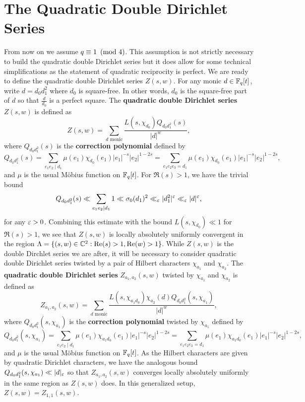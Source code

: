 \documentclass[12pt,reqno,oneside]{amsart}
\begin{document}
\section{The Quadratic Double Dirichlet Series}
    From now on we assume $q \equiv 1 \ \left(\text{mod }4\right)$. This assumption is not strictly necessary to build the quadratic double Dirichlet series but it does allow for some technical simplifications as the statement of quadratic reciprocity is perfect. We are ready to define the quadratic double Dirichlet series $Z(s,w)$. For any monic $d \in \mathbb{F}_{q}[t]$, write $d = d_{0}d_{1}^{2}$ where $d_{0}$ is square-free. In other words, $d_{0}$ is the square-free part of $d$ so that $\frac{d}{d_{0}}$ is a perfect square. The \textbf{quadratic double Dirichlet series} $Z(s,w)$ is defined as
    \[
        Z(s,w) = \sum_{\text{$d$ monic}}\frac{L(s,\chi_{d_{0}})Q_{d_{0}d_{1}^{2}}(s)}{|d|^{w}},
    \]
    where $Q_{d_{0}d_{1}^{2}}(s)$ is the \textbf{correction polynomial} defined by
    \[
        Q_{d_{0}d_{1}^{2}}(s) = \sum_{e_{1}e_{2} \mid d_{1}}\mu(e_{1})\chi_{d_{0}}(e_{1})|e_{1}|^{-s}|e_{2}|^{1-2s} = \sum_{e_{1}e_{2}e_{3} = d_{1}}\mu(e_{1})\chi_{d_{0}}(e_{1})|e_{1}|^{-s}|e_{2}|^{1-2s},
    \]
    and $\mu$ is the usual M\"obius function on $\mathbb{F}_{q}[t]$. For $\Re(s) > 1$, we have the trivial bound
    \[
        Q_{d_{0}d_{1}^{2}}(s) \ll \sum_{e_{1}e_{2} \mid d_{1}}1 \ll \sigma_{0}(d_{1})^{2} \ll_{\varepsilon} |d_{1}^{2}|^{\varepsilon} \ll_{\varepsilon} |d|^{\varepsilon},
    \]
    for any $\varepsilon > 0$. Combining this estimate with the bound $L(s,\chi_{d_{0}}) \ll 1$ for $\Re(s) > 1$, we see that $Z(s,w)$ is locally absolutely uniformly convergent in the region $\Lambda = \{(s,w) \in \mathbb{C}^{2}:\mathrm{Re}(s) > 1, \mathrm{Re}(w) > 1\}$. While $Z(s,w)$ is the double Dirchlet series we are after, it will be necessary to consider quadratic double Dirichlet series twisted by a pair of Hilbert characters $\chi_{a_{1}}$ and $\chi_{a_{2}}$. The \textbf{quadratic double Dirichlet series} $Z_{a_{1},a_{2}}(s,w)$ twisted by $\chi_{a_{1}}$ and $\chi_{a_{2}}$ is defined as
    \[
        Z_{a_{1},a_{2}}(s,w) = \sum_{\text{$d$ monic}}\frac{L(s,\chi_{a_{1}d_{0}})\chi_{a_{2}}(d)Q_{d_{0}d_{1}^{2}}(s,\chi_{a_{1}})}{|d|^{w}},
    \]
    where $Q_{d_{0}d_{1}^{2}}(s,\chi_{a_{1}})$ is the \textbf{correction polynomial} twisted by $\chi_{a_{1}}$ defined by
    \[
        Q_{d_{0}d_{1}^{2}}(s,\chi_{a_{1}}) = \sum_{e_{1}e_{2} \mid d_{1}}\mu(e_{1})\chi_{a_{1}d_{0}}(e_{1})|e_{1}|^{-s}|e_{2}|^{1-2s} = \sum_{e_{1}e_{2}e_{3} = d_{1}}\mu(e_{1})\chi_{a_{1}d_{0}}(e_{1})|e_{1}|^{-s}|e_{2}|^{1-2s},
    \]
    and $\mu$ is the usual M\"obius function on $\mathbb{F}_{q}[t]$. As the Hilbert characters are given by quadratic Dirichlet characters, we have the analogous bound $Q_{d_{0}d_{1}^{2}}(s,\chi_{a_{1}}) \ll |d|_{\varepsilon}$ so that $Z_{a_{1},a_{2}}(s,w)$ converges locally absolutely uniformly in the same region as $Z(s,w)$ does. In this generalized setup, $Z(s,w) = Z_{1,1}(s,w)$.
\end{document}
